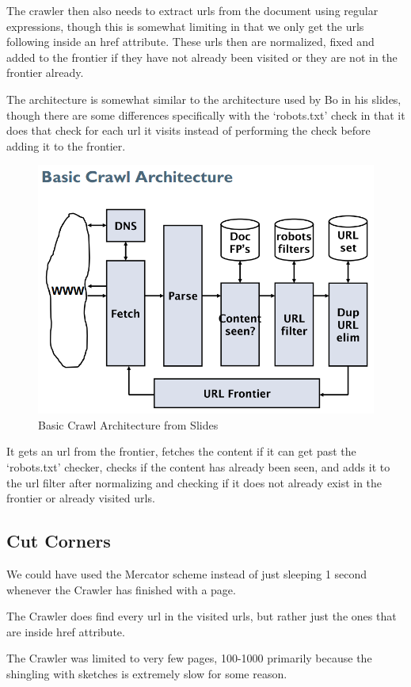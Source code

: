 	The crawler then also needs to extract urls from the document using regular expressions, though this is somewhat limiting in that we only get the urls following inside an href attribute. These urls then are normalized, fixed and added to the frontier if they have not already been visited or they are not in the frontier already.
	
	The architecture is somewhat similar to the architecture used by Bo in his slides, though there are some differences specifically with the `robots.txt' check in that it does that check for each url it visits instead of performing the check before adding it to the frontier.
	
	\begin{figure}[H]
	\centering
	\includegraphics[width=0.7\linewidth]{./Media/basiccrawlarchitecture}
	\caption{Basic Crawl Architecture from Slides}
	\label{fig:basiccrawlarchitecture}
	\end{figure}
	
	It gets an url from the frontier, fetches the content if it can get past the `robots.txt' checker, checks if the content has already been seen, and adds it to the url filter after normalizing and checking if it does not already exist in the frontier or already visited urls.
	
	\subsection{Cut Corners}
	We could have used the Mercator scheme instead of just sleeping 1 second whenever the Crawler has finished with a page.
	
	The Crawler does find every url in the visited urls, but rather just the ones that are inside href attribute.
	
	The Crawler was limited to very few pages, 100-1000 primarily because the shingling with sketches is extremely slow for some reason.
	
